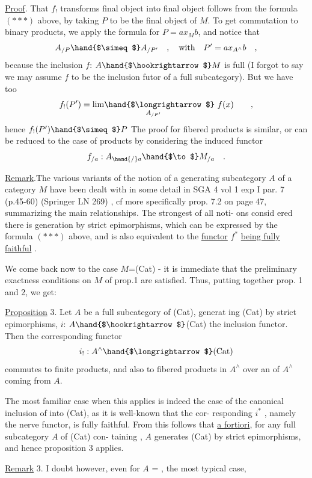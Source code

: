 
 \uline{Proof}. That $f_{!}$ transforms final object into final object follows
from the formula $(* * *)$ above, by taking $P$ to be the final object of $M$.
To get commutation to binary products, we apply the formula for $P=ax_{M}b$,
and notice that
\[ A_{/P} \hand{$\simeq$} A_{/P'} \quad , \quad \text{with} \quad P' = ax_{A^{\wedge}}b \quad , \]
because the inclusion $f$: $A \hand{$\hookrightarrow$} M$ is full (I forgot to say we may assume $f$
to be the inclusion futor of a full subcategory). But we have too
\[ f_{!}(P') = \underset{A_{/P'}}{\mathrm{lim}\hand{$\longrightarrow$}}\ f(x) \qquad , \]
hence $f_{!}(P') \hand{$\simeq$} P$ \hand{,}  The proof for fibered products is similar, or
can be reduced to the case of products by considering the induced functor
\[ f_{/a} : A_{\hand{/}a} \hand{$\to$} M_{/a} \quad . \]

\uline{Remark}.The various variants of the notion of a generating subcategory $A$
of a category $M$ have been dealt with in some detail in SGA 4 vol 1 exp I
par. 7 (p.45-60) (Springer LN 269) , cf more specifically prop. 7.2 on
page 47, summarizing the main relationships. The strongest of all noti-%
ons consid ered there is generation by strict epimorphisms, which can be
expressed by the formula $(* * *)$ above, and is also equivalent to the
\uline{functor} $f^{*}$ \uline{being fully faithful} .

We come back now to the case $M$=(Cat) - it is immediate that the
preliminary exactness conditions on $M$ of prop.1 are satisfied. Thus,
putting together prop. 1 and 2, we get:

\uline{Proposition} 3. Let $A$ be a full subcategory of (Cat), generat ing (Cat)
by strict epimorphisms, $i$: $A \hand{$\hookrightarrow$}$(Cat) the inclusion functor. Then the
corresponding functor
\[ i_{!}: A^{\wedge} \hand{$\longrightarrow$} \text{(Cat)} \]
commutes to finite products, and also to fibered products in $A^{\wedge}$ over an
 of $A^{\wedge}$ coming from $A$.

The most familiar case when this applies is indeed the case of the
canonical inclusion of \hand{$\Delta$} into (Cat), as it is well-known that the cor-%
responding $i^{*}$ , namely the nerve functor, is fully faithful. From
this follows that \uline{a fortiori}, for any full subcategory $A$ of (Cat) con-%
taining \hand{$\Delta$} , $A$ generates  (Cat) by strict epimorphisms, and hence
proposition 3 applies.

\uline{Remark} 3. I doubt however, even for $A$ = \hand{$\Delta$}, the most typical case,

